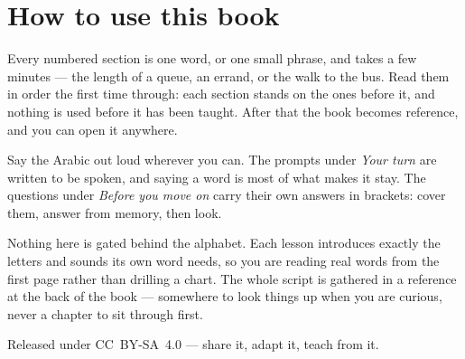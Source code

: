 \documentclass[11pt,twoside]{book}
\begin{document}
\section*{How to use this book}

Every numbered section is one word, or one small phrase, and takes a few
minutes --- the length of a queue, an errand, or the walk to the bus. Read them
in order the first time through: each section stands on the ones before it, and
nothing is used before it has been taught. After that the book becomes
reference, and you can open it anywhere.

Say the Arabic out loud wherever you can. The prompts under \emph{Your turn}
are written to be spoken, and saying a word is most of what makes it stay. The
questions under \emph{Before you move on} carry their own answers in brackets:
cover them, answer from memory, then look.

Nothing here is gated behind the alphabet. Each lesson introduces exactly the
letters and sounds its own word needs, so you are reading real words from the
first page rather than drilling a chart. The whole script is gathered in a
reference at the back of the book --- somewhere to look things up when you are
curious, never a chapter to sit through first.

Released under CC~BY-SA~4.0 --- share it, adapt it, teach from it.

\tableofcontents

\mainmatter








































\backmatter






\end{document}
